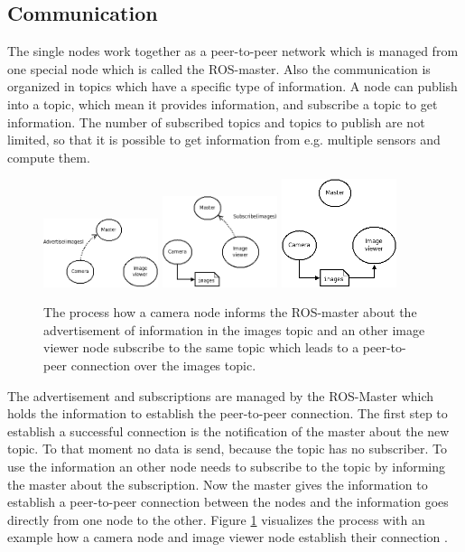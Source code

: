 \subsection{Communication}\label{ssec:communication}

The single nodes work together as a peer-to-peer network which is managed from one special node which is called the ROS-master.
Also the communication is organized in topics which have a specific type of information.
A node can publish into a topic, which mean it provides information, and subscribe a topic to get information.
The number of subscribed topics and topics to publish are not limited, so that it is possible to get information from e.g. multiple sensors and compute them.

\begin{figure}[h]
    \centering
    \includegraphics[width=0.30\textwidth]{img/ros_master/ros_master1.png}
    \includegraphics[width=0.30\textwidth]{img/ros_master/ros_master2.png}
    \includegraphics[width=0.30\textwidth]{img/ros_master/ros_master3.png}
    \caption{The process how a camera node informs the ROS-master about the advertisement of information in the images topic and an other image viewer node subscribe to the same topic which leads to a peer-to-peer connection over the images topic.}
    \label{fig:ros_master}
\end{figure}

The advertisement and subscriptions are managed by the ROS-Master which holds the information to establish the peer-to-peer connection.
The first step to establish a successful connection is the notification of the master about the new topic.
To that moment no data is send, because the topic has no subscriber.
To use the information an other node needs to subscribe to the topic by informing the master about the subscription.
Now the master gives the information to establish a peer-to-peer connection between the nodes and the information goes directly from one node to the other.
Figure \ref{fig:ros_master} visualizes the process with an example how a camera node and image viewer node establish their connection \cite{rosMaster}.

